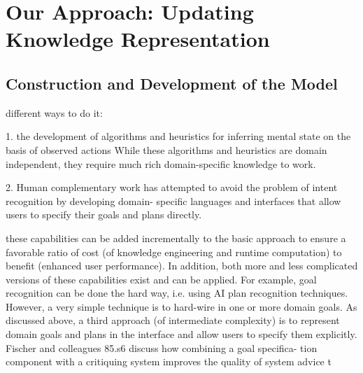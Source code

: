 \graphicspath{{Figures/}}

\chapter{Our Approach: Updating Knowledge Representation} %
\label{cha:knowledge_updating}

\section{Construction and Development of the Model} %
\label{sec:construction_and_development_of_the_model}
different ways to do it:

1. the development of algorithms and heuristics for inferring mental state on the basis of observed actions While these algorithms and heuristics are domain independent, they require much rich domain-specific knowledge to work.

2. Human complementary work has attempted to avoid the problem of intent recognition by developing domain- specific languages and interfaces that allow users to specify their goals and plans directly.


these capabilities can be added incrementally to the basic approach to ensure a favorable ratio of cost (of knowledge engineering and runtime computation) to benefit (enhanced user performance). In addition, both more and less complicated versions of these capabilities exist and can be applied. For example, goal recognition can be done the hard way, i.e. using AI plan recognition techniques. However, a very simple technique is to hard-wire in one or more domain goals. As discussed above, a third approach (of intermediate complexity) is to represent domain goals and plans in the interface and allow users to specify them explicitly. Fischer and colleagues 85.s6 discuss how combining a goal specifica- tion component with a critiquing system improves the quality of system advice t


